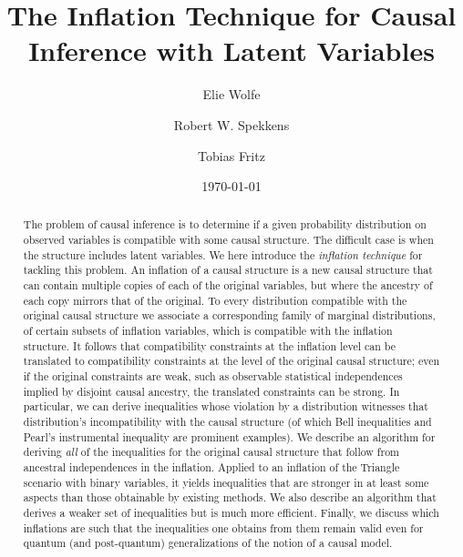 \documentclass[aps,english,10pt,superscriptaddress,onecolumn,twoside,longbibliography,pra,floatfix,fleqn,nofootinbib]{revtex4-1}%
\theoremstyle{definition}
\newcounter{example}[section]
\begin{document}
\title{The Inflation Technique for Causal Inference with Latent Variables}

\author{Elie Wolfe}

\author{Robert W. Spekkens}

\author{Tobias Fritz}

\date{\today}


\begin{abstract}

The problem of causal inference is to determine if a given probability distribution on observed variables is compatible with some causal structure. The difficult case is when the structure includes latent variables.  We here introduce the \emph{inflation technique} for tackling this problem. An inflation of a causal structure is a new causal structure that can contain multiple copies of each of the original variables, but where the ancestry of each copy mirrors that of the original. To every distribution compatible with the original causal structure we associate a corresponding family of marginal distributions, of certain subsets of inflation variables, which is compatible with the inflation structure. It follows that compatibility constraints at the inflation level can be translated to compatibility constraints at the level of the original causal structure; even if the original constraints are weak, such as observable statistical independences implied by disjoint causal ancestry, the translated constraints can be strong. In particular, we can derive inequalities whose violation by a distribution witnesses that distribution's incompatibility with the causal structure (of which Bell inequalities and Pearl's instrumental inequality are prominent examples). We describe an algorithm for deriving \emph{all} of the inequalities for the original causal structure that follow from ancestral independences in the inflation. Applied to an inflation of the Triangle scenario with binary variables, it yields inequalities that are stronger in at least some aspects than those obtainable by existing methods. We also describe an algorithm that derives a weaker set of inequalities but is much more efficient. Finally, we discuss which inflations are such that the inequalities one obtains from them remain valid even for quantum (and post-quantum) generalizations of the notion of a causal model.


\end{abstract}
\end{document}
